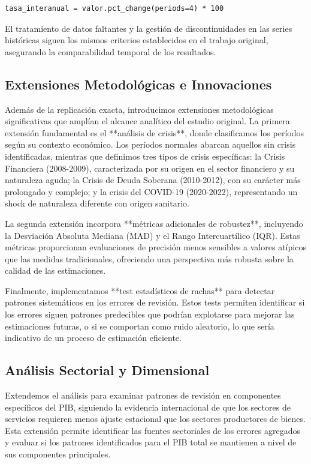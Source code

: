 \documentclass[12pt,a4paper]{article}
\begin{document}
\begin{verbatim}
tasa_interanual = valor.pct_change(periods=4) * 100
\end{verbatim}

El tratamiento de datos faltantes y la gestión de discontinuidades en las series históricas siguen los mismos criterios establecidos en el trabajo original, asegurando la comparabilidad temporal de los resultados.

\subsection{Extensiones Metodológicas e Innovaciones}

Además de la replicación exacta, introducimos extensiones metodológicas significativas que amplían el alcance analítico del estudio original. La primera extensión fundamental es el **análisis de crisis**, donde clasificamos los períodos según su contexto económico. Los períodos normales abarcan aquellos sin crisis identificadas, mientras que definimos tres tipos de crisis específicas: la Crisis Financiera (2008-2009), caracterizada por su origen en el sector financiero y su naturaleza aguda; la Crisis de Deuda Soberana (2010-2012), con su carácter más prolongado y complejo; y la crisis del COVID-19 (2020-2022), representando un shock de naturaleza diferente con origen sanitario.

La segunda extensión incorpora **métricas adicionales de robustez**, incluyendo la Desviación Absoluta Mediana (MAD) y el Rango Intercuartílico (IQR). Estas métricas proporcionan evaluaciones de precisión menos sensibles a valores atípicos que las medidas tradicionales, ofreciendo una perspectiva más robusta sobre la calidad de las estimaciones.

Finalmente, implementamos **test estadísticos de rachas** para detectar patrones sistemáticos en los errores de revisión. Estos tests permiten identificar si los errores siguen patrones predecibles que podrían explotarse para mejorar las estimaciones futuras, o si se comportan como ruido aleatorio, lo que sería indicativo de un proceso de estimación eficiente.

\subsection{Análisis Sectorial y Dimensional}

Extendemos el análisis para examinar patrones de revisión en componentes específicos del PIB, siguiendo la evidencia internacional de que los sectores de servicios requieren menos ajuste estacional que los sectores productores de bienes. Esta extensión permite identificar las fuentes sectoriales de los errores agregados y evaluar si los patrones identificados para el PIB total se mantienen a nivel de sus componentes principales.
\end{document}
